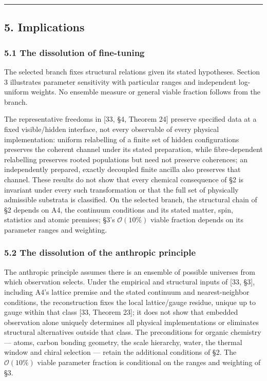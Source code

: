 \documentclass[
]{article}
\begin{document}
\begin{center}\rule{0.5\linewidth}{0.5pt}\end{center}

\hypertarget{implications}{%
\subsection{5. Implications}\label{implications}}

\hypertarget{the-dissolution-of-fine-tuning}{%
\subsubsection{5.1 The dissolution of
fine-tuning}\label{the-dissolution-of-fine-tuning}}

The selected branch fixes structural relations given its stated
hypotheses. Section 3 illustrates parameter sensitivity with particular
ranges and independent log-uniform weights. No ensemble measure or
general viable fraction follows from the branch.

The representative freedoms in {[}33, §4, Theorem 24{]} preserve
specified data at a fixed visible/hidden interface, not every observable
of every physical implementation: uniform relabelling of a finite set of
hidden configurations preserves the coherent channel under its stated
preparation, while fibre-dependent relabelling preserves rooted
populations but need not preserve coherences; an independently prepared,
exactly decoupled finite ancilla also preserves that channel. These
results do not show that every chemical consequence of §2 is invariant
under every such transformation or that the full set of physically
admissible substrata is classified. On the selected branch, the
structural chain of §2 depends on A4, the continuum conditions and its
stated matter, spin, statistics and atomic premises; §3's
\(\mathcal{O}(10\%)\) viable fraction depends on its parameter ranges
and weighting.

\hypertarget{the-dissolution-of-the-anthropic-principle}{%
\subsubsection{5.2 The dissolution of the anthropic
principle}\label{the-dissolution-of-the-anthropic-principle}}

The anthropic principle assumes there is an ensemble of possible
universes from which observation selects. Under the empirical and
structural inputs of {[}33, §3{]}, including A4's lattice premise and
the stated continuum and nearest-neighbor conditions, the reconstruction
fixes the local lattice/gauge residue, unique up to gauge within that
class {[}33, Theorem 23{]}; it does not show that embedded observation
alone uniquely determines all physical implementations or eliminates
structural alternatives outside that class. The preconditions for
organic chemistry --- atoms, carbon bonding geometry, the scale
hierarchy, water, the thermal window and chiral selection --- retain the
additional conditions of §2. The \(\mathcal{O}(10\%)\) viable parameter
fraction is conditional on the ranges and weighting of §3.
\end{document}
